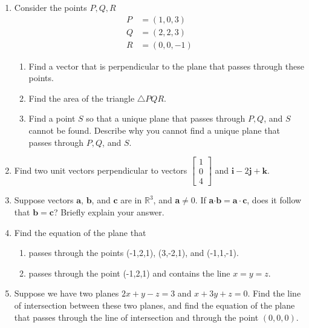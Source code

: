 \documentclass{article}
\begin{document}
\begin{enumerate}
\item 
Consider the points $P, Q, R$ \\
\begin{align*}
P &=(1,0,3)\\
Q &=(2,2,3)\\
R &=(0,0,-1)
\end{align*}
\begin{enumerate}
\item Find a vector that is perpendicular to the plane that passes through these points.
\item Find the area of the triangle $\bigtriangleup PQR$.
\item Find a point $S$ so that a unique plane that passes through $P, Q$, and $S$ cannot be found. Describe why you cannot find a unique plane that passes through $P, Q$, and $S$. 
\end{enumerate}
\item %
Find two unit vectors perpendicular to vectors $\begin{bmatrix} 1 \\ 0\\4 \end{bmatrix}$ and $\mathbf{i}-2\mathbf{j}+\mathbf{k}$. 
\item 
Suppose vectors $\mathbf{a}$, $\mathbf{b}$, and $\mathbf{c}$ are in $\mathbb{R}^3$, and \textbf{a}$\ne 0$. If \textbf{a}$\cdot\mathbf{b}=\mathbf{a}\cdot\mathbf{c}$, does it follow that $\mathbf{b}=\mathbf{c}$? Briefly explain your answer. 
\item %
Find the equation of the plane that
\begin{enumerate}
\item passes through the points (-1,2,1), (3,-2,1), and (-1,1,-1).
\item passes through the point (-1,2,1) and contains the line $x=y=z$.
\end{enumerate}
\item %
Suppose we have two planes $2x+y-z=3$ and $x+3y+z=0$. Find the line of intersection between these two planes, and find the equation of the plane that passes through the line of intersection and through the point $(0,0,0)$.

\end{enumerate}
\end{document}
